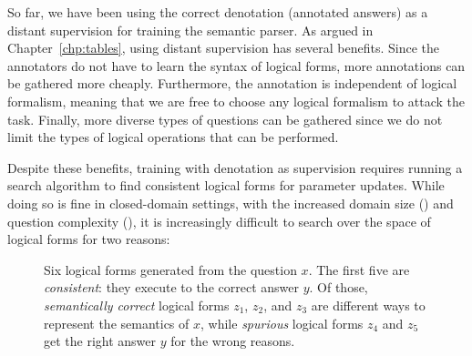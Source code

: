 

So far,
we have been using the correct denotation (annotated answers)
as a distant supervision for training the semantic parser.
As argued in Chapter~\ref{chp:tables},
using distant supervision has several benefits.
Since the annotators do not have to learn the syntax of logical forms,
more annotations can be gathered more cheaply.
Furthermore, the annotation is independent of logical formalism,
meaning that we are free to choose any logical formalism
to attack the task.
Finally, more diverse types of questions can be gathered
since we do not limit the types of logical operations that
can be performed.

Despite these benefits,
training with denotation as supervision
requires running a search algorithm to find consistent logical forms
for parameter updates.
While doing so is fine in closed-domain settings,
with the increased domain size (\Breadth)
and question complexity (\Depth),
it is increasingly
difficult to search over the space of logical forms
for two reasons:

\begin{figure}[tp]
\centering

\caption[
Example of correct and spurious logical forms.
]{Six logical forms
generated from the question $x$.
The first five are \emph{consistent}:
they execute to the correct answer $y$.
Of those, \emph{semantically correct}
logical forms $z_1$, $z_2$, and $z_3$
are different ways to represent the semantics of $x$,
while \emph{spurious} logical forms $z_4$ and $z_5$
get the right answer $y$ for the wrong reasons.}
\label{fig:dpd-running}
\end{figure}

